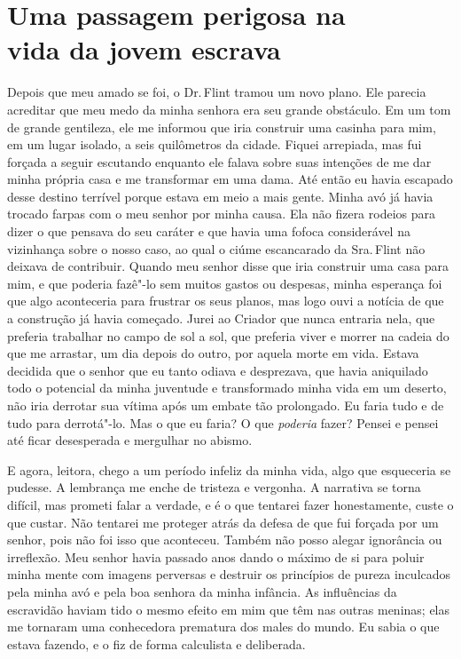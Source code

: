 \chapter*{Uma passagem perigosa na\\ vida da jovem escrava}

Depois que meu amado se foi, o Dr.\,Flint tramou um novo plano. Ele parecia acreditar que meu medo da minha
senhora era seu grande obstáculo. Em um tom de grande gentileza, ele me
informou que iria construir uma casinha para mim, em um lugar isolado, a
seis quilômetros da cidade. Fiquei arrepiada, mas fui forçada a seguir
escutando enquanto ele falava sobre suas intenções de me dar minha
própria casa e me transformar em uma dama. Até então eu havia escapado
desse destino terrível porque estava em meio a mais gente. Minha avó já
havia trocado farpas com o meu senhor por minha causa. Ela não fizera
rodeios para dizer o que pensava do seu caráter e que havia uma fofoca
considerável na vizinhança sobre o nosso caso, ao qual o ciúme
escancarado da Sra.\,Flint não deixava de contribuir. Quando meu senhor
disse que iria construir uma casa para mim, e que poderia fazê"-lo sem
muitos gastos ou despesas, minha esperança foi que algo aconteceria para
frustrar os seus planos, mas logo ouvi a notícia de que a construção já
havia começado. Jurei ao Criador que nunca entraria nela, que preferia
trabalhar no campo de sol a sol, que preferia viver e morrer na cadeia
do que me arrastar, um dia depois do outro, por aquela morte em vida.
Estava decidida que o senhor que eu tanto odiava e desprezava, que havia
aniquilado todo o potencial da minha juventude e transformado minha vida
em um deserto, não iria derrotar sua vítima após um embate tão
prolongado. Eu faria tudo e de tudo para derrotá"-lo. Mas o que eu faria?
O que \emph{poderia} fazer? Pensei e pensei até ficar desesperada e
mergulhar no abismo.

E agora, leitora, chego a um período
infeliz da minha vida, algo que esqueceria se pudesse. A lembrança me
enche de tristeza e vergonha. A narrativa se torna difícil, mas prometi
falar a verdade, e é o que tentarei fazer honestamente, custe o que
custar. Não tentarei me proteger atrás da defesa de que fui forçada por
um senhor, pois não foi isso que aconteceu.
Também não posso alegar ignorância
ou irreflexão. Meu senhor havia passado anos dando o máximo de si para
poluir minha mente com imagens perversas e destruir os princípios de
pureza inculcados pela minha avó e pela boa senhora da minha infância.
As influências da escravidão haviam tido o mesmo efeito em mim que têm
nas outras meninas; elas me tornaram uma conhecedora prematura dos males
do mundo. Eu sabia o que estava fazendo, e o fiz de forma calculista e
deliberada.

